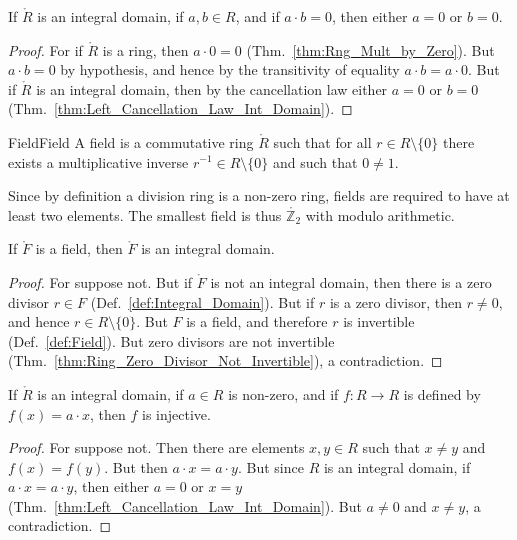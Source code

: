     \begin{theorem}
        \label{thm:Int_Domain_AB_EQ_Zero_A_or_B_EQ_Zero}%
        If $\ring{R}$ is an integral domain, if $a,b\in{R}$, and if
        $a\cdot{b}=0$, then either $a=0$ or $b=0$.
    \end{theorem}
    \begin{proof}
        For if $\ring{R}$ is a ring, then $a\cdot{0}=0$
        (Thm.~\ref{thm:Rng_Mult_by_Zero}). But $a\cdot{b}=0$ by hypothesis,
        and hence by the transitivity of equality $a\cdot{b}=a\cdot{0}$.
        But if $\ring{R}$ is an integral domain, then by the cancellation
        law either $a=0$ or $b=0$
        (Thm.~\ref{thm:Left_Cancellation_Law_Int_Domain}).
    \end{proof}
    \begin{fdefinition}{Field}{Field}
        A field is a commutative ring $\ring{R}$ such that for all
        $r\in{R}\setminus\{0\}$ there exists a multiplicative inverse
        $r^{\minus{1}}\in{R}\setminus\{0\}$ and such that $0\ne{1}$.
    \end{fdefinition}
    \begin{example}
        Since by definition a division ring is a non-zero ring, fields are
        required to have at least two elements. The smallest field is thus
        $\ring{\mathbb{Z}_{2}}$ with modulo arithmetic.
    \end{example}
    \begin{theorem}
        \label{thm:Fields_are_Int_Domains}%
        If $\ring{F}$ is a field, then $\ring{F}$ is an integral domain.
    \end{theorem}
    \begin{proof}
        For suppose not. But if $\ring{F}$ is not an integral domain,
        then there is a zero divisor $r\in{F}$
        (Def.~\ref{def:Integral_Domain}). But if $r$ is a zero divisor, then
        $r\ne{0}$, and hence $r\in{R}\setminus\{0\}$. But $F$ is a field,
        and therefore $r$ is invertible (Def.~\ref{def:Field}). But
        zero divisors are not invertible
        (Thm.~\ref{thm:Ring_Zero_Divisor_Not_Invertible}), a contradiction.
    \end{proof}
    \begin{theorem}
        \label{thm:Int_Domain_Left_Mult_is_Inj}%
        If $\ring{R}$ is an integral domain, if $a\in{R}$ is non-zero, and
        if $f:R\rightarrow{R}$ is defined by $f(x)=a\cdot{x}$, then $f$
        is injective.
    \end{theorem}
    \begin{proof}
        For suppose not. Then there are elements $x,y\in{R}$ such that
        $x\ne{y}$ and $f(x)=f(y)$. But then $a\cdot{x}=a\cdot{y}$. But since
        $R$ is an integral domain, if $a\cdot{x}=a\cdot{y}$, then either
        $a=0$ or $x=y$ (Thm.~\ref{thm:Left_Cancellation_Law_Int_Domain}).
        But $a\ne{0}$ and $x\ne{y}$, a contradiction.
    \end{proof}
